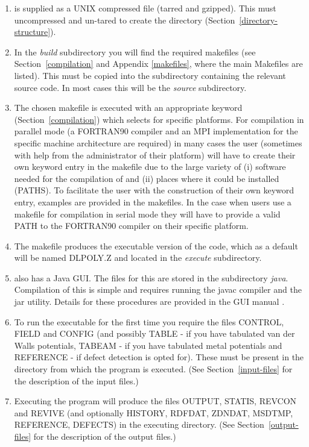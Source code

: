 \begin{enumerate}
\item \D is supplied as a UNIX compressed file (tarred and
gzipped).  This must uncompressed and un-tared to create the \D
directory (Section~\ref{directory-structure}).

\item In the {\em build} subdirectory you will find the required
\D makefiles (see Section~\ref{compilation} and Appendix
\ref{makefiles}, where the main Makefiles are listed).  This must be
copied into the subdirectory containing the relevant source code. In
most cases this will be the {\em source} subdirectory.

\item The chosen makefile is executed with an appropriate keyword
(Section~\ref{compilation}) which selects for specific platforms.
For \D compilation in parallel mode (a FORTRAN90 compiler
and an MPI implementation for the specific machine architecture are
required) in many cases the user (sometimes with help from the
administrator of their platform) will have to create their own
keyword entry in the makefile due to the large variety of (i)
software needed for the compilation of \D and (ii) places where
it could be installed (PATHS).  To facilitate the user with the
construction of their own keyword entry, examples are provided
in the makefiles.  In the case when users use a makefile for \D
compilation in serial mode they will have to provide a valid
PATH to the FORTRAN90 compiler on their specific platform.

\item The makefile produces the executable version of the code,
which as a default will be named DLPOLY.Z and located in the {\em
execute} subdirectory.

\item \D also has a Java GUI.  The files for this are stored
in the subdirectory {\em java}.  Compilation of this is simple and
requires running the javac compiler and the jar utility.  Details
for these procedures are provided in the GUI manual \cite{smith-gui}.

\item To run the executable for the first time you require the files
CONTROL, FIELD and CONFIG (and possibly TABLE - if you have
tabulated van der Walls potentials, TABEAM - if you have
tabulated metal potentials and REFERENCE - if defect detection is opted
for).  These must be present in the directory from which the program
is executed. (See Section~\ref{input-files} for the description of
the input files.)

\item Executing the program will produce the files OUTPUT, STATIS,
REVCON and REVIVE (and optionally HISTORY, RDFDAT, ZDNDAT, MSDTMP,
REFERENCE, DEFECTS) in the executing directory.
(See Section~\ref{output-files} for the description of the output files.)
\end{enumerate}

